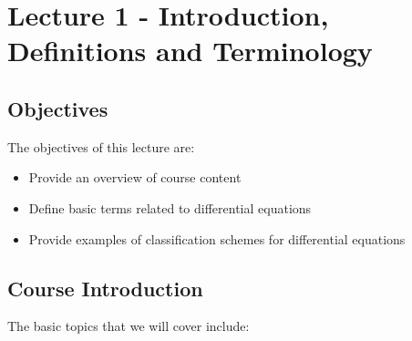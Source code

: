 \chapter{Lecture 1 - Introduction, Definitions and Terminology}
\label{ch:lec1}%
\section{Objectives}
The objectives of this lecture are:
\begin{itemize}
\item Provide an overview of course content
\item Define basic terms related to differential equations
\item Provide examples of classification schemes for differential equations
\end{itemize}

\section{Course Introduction}
The basic topics that we will cover include:


